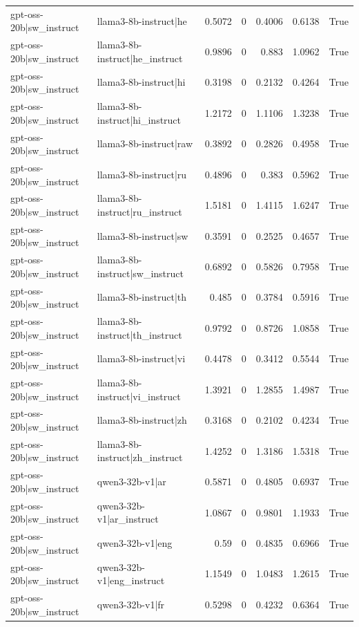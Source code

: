 \begin{table}
\begin{tabular}{l l r r r r l}
gpt-oss-20b|sw_instruct & llama3-8b-instruct|he & 0.5072 & 0 & 0.4006 & 0.6138 & True \\
gpt-oss-20b|sw_instruct & llama3-8b-instruct|he_instruct & 0.9896 & 0 & 0.883 & 1.0962 & True \\
gpt-oss-20b|sw_instruct & llama3-8b-instruct|hi & 0.3198 & 0 & 0.2132 & 0.4264 & True \\
gpt-oss-20b|sw_instruct & llama3-8b-instruct|hi_instruct & 1.2172 & 0 & 1.1106 & 1.3238 & True \\
gpt-oss-20b|sw_instruct & llama3-8b-instruct|raw & 0.3892 & 0 & 0.2826 & 0.4958 & True \\
gpt-oss-20b|sw_instruct & llama3-8b-instruct|ru & 0.4896 & 0 & 0.383 & 0.5962 & True \\
gpt-oss-20b|sw_instruct & llama3-8b-instruct|ru_instruct & 1.5181 & 0 & 1.4115 & 1.6247 & True \\
gpt-oss-20b|sw_instruct & llama3-8b-instruct|sw & 0.3591 & 0 & 0.2525 & 0.4657 & True \\
gpt-oss-20b|sw_instruct & llama3-8b-instruct|sw_instruct & 0.6892 & 0 & 0.5826 & 0.7958 & True \\
gpt-oss-20b|sw_instruct & llama3-8b-instruct|th & 0.485 & 0 & 0.3784 & 0.5916 & True \\
gpt-oss-20b|sw_instruct & llama3-8b-instruct|th_instruct & 0.9792 & 0 & 0.8726 & 1.0858 & True \\
gpt-oss-20b|sw_instruct & llama3-8b-instruct|vi & 0.4478 & 0 & 0.3412 & 0.5544 & True \\
gpt-oss-20b|sw_instruct & llama3-8b-instruct|vi_instruct & 1.3921 & 0 & 1.2855 & 1.4987 & True \\
gpt-oss-20b|sw_instruct & llama3-8b-instruct|zh & 0.3168 & 0 & 0.2102 & 0.4234 & True \\
gpt-oss-20b|sw_instruct & llama3-8b-instruct|zh_instruct & 1.4252 & 0 & 1.3186 & 1.5318 & True \\
gpt-oss-20b|sw_instruct & qwen3-32b-v1|ar & 0.5871 & 0 & 0.4805 & 0.6937 & True \\
gpt-oss-20b|sw_instruct & qwen3-32b-v1|ar_instruct & 1.0867 & 0 & 0.9801 & 1.1933 & True \\
gpt-oss-20b|sw_instruct & qwen3-32b-v1|eng & 0.59 & 0 & 0.4835 & 0.6966 & True \\
gpt-oss-20b|sw_instruct & qwen3-32b-v1|eng_instruct & 1.1549 & 0 & 1.0483 & 1.2615 & True \\
gpt-oss-20b|sw_instruct & qwen3-32b-v1|fr & 0.5298 & 0 & 0.4232 & 0.6364 & True \\

\end{tabular}
\end{table}
